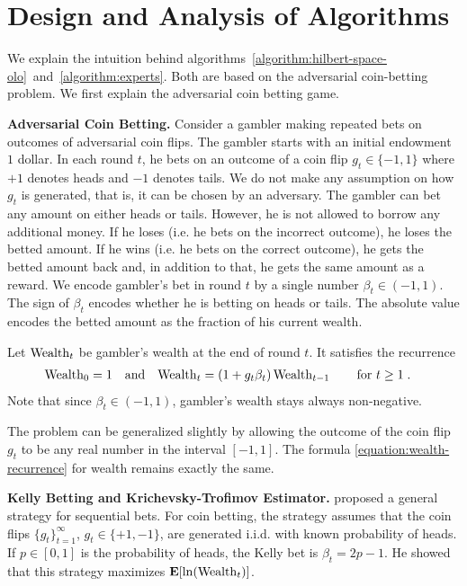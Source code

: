 \section{Design and Analysis of Algorithms}

We explain the intuition behind
algorithms~\ref{algorithm:hilbert-space-olo}~and~\ref{algorithm:experts}.  Both
are based on the adversarial coin-betting problem. We first explain the
adversarial coin betting game.

\textbf{Adversarial Coin Betting.}
Consider a gambler making repeated bets on outcomes of adversarial coin flips.
The gambler starts with an initial endowment $1$ dollar. In each round $t$, he
bets on an outcome of a coin flip $g_t \in \{-1,1\}$ where $+1$ denotes heads
and $-1$ denotes tails. We do not make any assumption on how $g_t$ is
generated, that is, it can be chosen by an adversary.  The gambler can bet any
amount on either heads or tails. However, he is not allowed to borrow any
additional money. If he loses (i.e. he bets on the incorrect outcome), he loses
the betted amount. If he wins (i.e. he bets on the correct outcome), he gets
the betted amount back and, in addition to that, he gets the same amount as a
reward.
We encode gambler's bet in round $t$ by a single number $\beta_t \in (-1,1)$.
The sign of $\beta_t$ encodes whether he is betting on heads or tails. The
absolute value encodes the betted amount as the fraction of his current wealth.

Let $\operatorname{Wealth}_t$ be gambler's wealth at the end of round $t$. It satisfies the
recurrence
\begin{align}
\label{equation:wealth-recurrence}
\operatorname{Wealth}_0 & = 1 &
& \text{and} &
\operatorname{Wealth}_t & = (1 + g_t \beta_t) \operatorname{Wealth}_{t-1} \qquad \text{for $t \ge 1$} \; .
\end{align}
Note that since $\beta_t \in (-1,1)$, gambler's wealth stays always non-negative.

The problem can be generalized slightly by allowing the outcome of the coin
flip $g_t$ to be any real number in the interval $[-1,1]$. The formula
\eqref{equation:wealth-recurrence} for wealth remains exactly the same.

\textbf{Kelly Betting and Krichevsky-Trofimov Estimator.}
\citet{Kelly-1956} proposed a general strategy for sequential bets. For coin
betting, the strategy assumes that the coin flips $\{g_t\}_{t=1}^\infty$, $g_t
\in \{+1,-1\}$, are generated i.i.d. with known probability of heads. If $p \in
[0,1]$ is the probability of heads, the Kelly bet is
$
\beta_t = 2p - 1
$.
He showed that this strategy maximizes $\operatorname*{\mathbf{E}}[\ln(\operatorname{Wealth}_t)]$.

